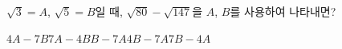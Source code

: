 $\sqrt{3}=A$, $\sqrt{5}=B$일 때, $\sqrt{80}-\sqrt{147}$을 $A$, $B$를 사용하여 나타내면?
\begin{choices32}{$4A-7B$}{$7A-4B$}{$B-7A$}{$4B-7A$}{$7B-4A$}\end{choices32}
